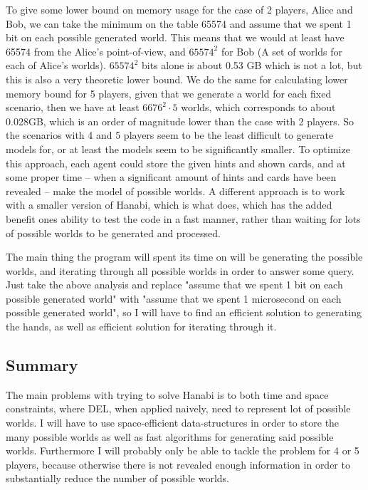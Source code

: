 To give some lower bound on memory usage for the case of 2 players, Alice and Bob, we can take the minimum on the table 65574 and assume that we spent 1 bit on each possible generated world. 
This means that we would at least have 65574 from the Alice's point-of-view, and $65574^2$ for Bob (A set of worlds for each of Alice's worlds). 
$65574^2$ bits alone is about 0.53 GB which is not a lot, but this is also a very theoretic lower bound. 
We do the same for calculating lower memory bound for 5 players, given that we generate a world for each fixed scenario, then we have at least $6676^2 \cdot 5$ worlds, which corresponds to about 0.028GB, which is an order of magnitude lower than the case with 2 players.
So the scenarios with 4 and 5 players seem to be the least difficult to generate models for, or at least the models seem to be significantly smaller.
To optimize this approach, each agent could store the given hints and shown cards, and at some proper time -- when a significant amount of hints and cards have been revealed -- make the model of possible worlds. 
A different approach is to work with a smaller version of Hanabi, which is what \cite{EgerAndMartens17} does, which has the added benefit ones ability to test the code in a fast manner, rather than waiting for lots of possible worlds to be generated and processed.

The main thing the program will spent its time on will be generating the possible worlds, and iterating through all possible worlds in order to answer some query. 
Just take the above analysis and replace "assume that we spent 1 bit on each possible generated world" with "assume that we spent 1 microsecond on each possible generated world", so I will have to find an efficient solution to generating the hands, as well as efficient solution for iterating through it.

\subsection{Summary}
The main problems with trying to solve Hanabi is to both time and space constraints, where DEL, when applied naively, need to represent lot of possible worlds. 
I will have to use space-efficient data-structures in order to store the many possible worlds as well as fast algorithms for generating said possible worlds. 
Furthermore I will probably only be able to tackle the problem for 4 or 5 players, because otherwise there is not revealed enough information in order to substantially reduce the number of possible worlds.
